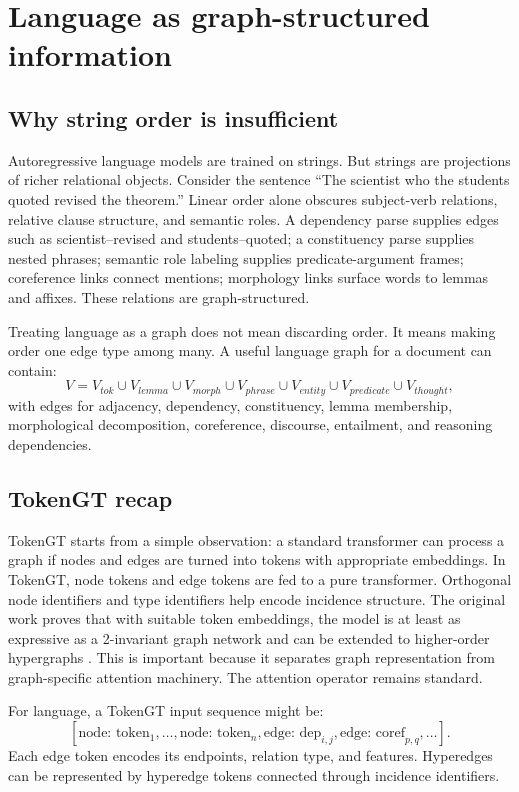 \documentclass[11pt]{article}
\newcommand{\1}{\mathbf{1}}
\begin{document}
\section{Language as graph-structured information}

\subsection{Why string order is insufficient}

Autoregressive language models are trained on strings. But strings are projections of richer relational objects. Consider the sentence ``The scientist who the students quoted revised the theorem.'' Linear order alone obscures subject-verb relations, relative clause structure, and semantic roles. A dependency parse supplies edges such as scientist--revised and students--quoted; a constituency parse supplies nested phrases; semantic role labeling supplies predicate-argument frames; coreference links connect mentions; morphology links surface words to lemmas and affixes. These relations are graph-structured.

Treating language as a graph does not mean discarding order. It means making order one edge type among many. A useful language graph for a document can contain:
\[
V=V_{tok}\cup V_{lemma}\cup V_{morph}\cup V_{phrase}\cup V_{entity}\cup V_{predicate}\cup V_{thought},
\]
with edges for adjacency, dependency, constituency, lemma membership, morphological decomposition, coreference, discourse, entailment, and reasoning dependencies.

\subsection{TokenGT recap}

TokenGT starts from a simple observation: a standard transformer can process a graph if nodes and edges are turned into tokens with appropriate embeddings. In TokenGT, node tokens and edge tokens are fed to a pure transformer. Orthogonal node identifiers and type identifiers help encode incidence structure. The original work proves that with suitable token embeddings, the model is at least as expressive as a 2-invariant graph network and can be extended to higher-order hypergraphs \cite{KimTokenGT2022}. This is important because it separates graph representation from graph-specific attention machinery. The attention operator remains standard.

For language, a TokenGT input sequence might be:
\[
[\text{node: token}_1,\ldots,\text{node: token}_n,\text{edge: dep}_{i,j},\text{edge: coref}_{p,q},\ldots].
\]
Each edge token encodes its endpoints, relation type, and features. Hyperedges can be represented by hyperedge tokens connected through incidence identifiers.
\end{document}
